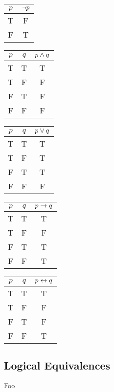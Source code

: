 \begin{tabular}{c|c}
$p$ & $\neg p$ \\\hline
T   & F        \\
F   & T
\end{tabular}

\begin{tabular}{c|c|c}
$p$ & $q$ & $p\wedge q$ \\\hline
T   & T   & T         \\
T   & F   & F         \\
F   & T   & F         \\
F   & F   & F
\end{tabular}

\begin{tabular}{c|c|c}
$p$ & $q$ & $p\vee q$ \\\hline
T   & T   & T        \\
T   & F   & T        \\
F   & T   & T        \\
F   & F   & F
\end{tabular}

\begin{tabular}{c|c|c}
$p$ & $q$ & $p\to q$ \\\hline
T   & T   & T        \\
T   & F   & F        \\
F   & T   & T        \\
F   & F   & T
\end{tabular}

\begin{tabular}{c|c|c}
$p$ & $q$ & $p\leftrightarrow q$ \\\hline
T   & T   & T         \\
T   & F   & F         \\
F   & T   & F         \\
F   & F   & T
\end{tabular}

\subsection{Logical Equivalences}

Foo

